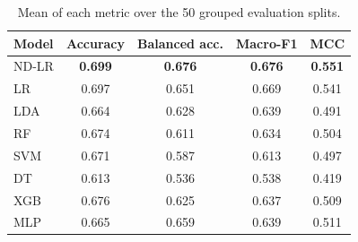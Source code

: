 \begin{table}[t]
\centering
\small
\caption{Mean of each metric over the 50 grouped evaluation splits.}
\label{tab:model_results}
\begin{tabular}{lcccc}
\hline
Model & Accuracy & Balanced acc. & Macro-F1 & MCC \\
\hline
ND-LR & \textbf{0.699} & \textbf{0.676} & \textbf{0.676} & \textbf{0.551} \\
LR & 0.697 & 0.651 & 0.669 & 0.541 \\
LDA & 0.664 & 0.628 & 0.639 & 0.491 \\
RF & 0.674 & 0.611 & 0.634 & 0.504 \\
SVM & 0.671 & 0.587 & 0.613 & 0.497 \\
DT & 0.613 & 0.536 & 0.538 & 0.419 \\
XGB & 0.676 & 0.625 & 0.637 & 0.509 \\
MLP & 0.665 & 0.659 & 0.639 & 0.511 \\
\hline
\end{tabular}
\end{table}
